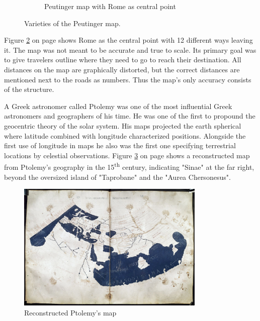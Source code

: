 \begin{figure}[!htb]
\begin{subfigure}[t]{0.4\textwidth}
    \caption{Peutinger map with Rome as central point}
    \label{fig:peutinger-rome}
  \end{subfigure}
  \caption[
    Varieties of the Peutinger map, Urldate: 07.2106
    \newline
    \small\texttt{\url{https://web.archive.org/web/20080129123649/http://www.kargi.de/Geschichte/Peutinger/Peutinger.bmp}}
    \newline
    \small\texttt{\url{https://web.archive.org/web/20060106224928/http://www.kargi.de/Geschichte/Peutinger/peutinger_rom.jpg}}
  ]{
    Varieties of the Peutinger map.
  }
\end{figure}

Figure \ref{fig:peutinger-rome} on page \pageref{fig:peutinger-rome} shows Rome as the central point with 12 different ways leaving it. The map was not meant to be accurate and true to scale. Its primary goal was to give travelers outline where they need to go to reach their destination. All distances on the map are graphically distorted, but the correct distances are mentioned next to the roads as numbers. Thus the map's only accuracy consists of the structure.

A Greek astronomer called Ptolemy was one of the most influential Greek astronomers and geographers of his time. He was one of the first to propound the geocentric theory of the solar system. His maps projected the earth spherical where latitude combined with longitude characterized positions. Alongside the first use of longitude in maps he also was the first one specifying terrestrial locations by celestial observations. Figure \ref{fig:ptolemy} on page \pageref{fig:ptolemy} shows a reconstructed map from Ptolemy's geography in the 15\textsuperscript{th} century, indicating "Sinae" at the far right, beyond the oversized island of "Taprobane" and the "Aurea Chersonesus".

\begin{figure}[!htb]
\centering
\includegraphics[width=0.8\textwidth,keepaspectratio]{images/history/ptolemy-map.jpg}
\caption[
    Reconstructed Ptolemy's map, Urldate: 07.2016 \newline
\small\texttt{\url{https://upload.wikimedia.org/wikipedia/commons/2/23/PtolemyWorldMap.jpg}}
]{Reconstructed Ptolemy's map}
\label{fig:ptolemy}
\end{figure}

